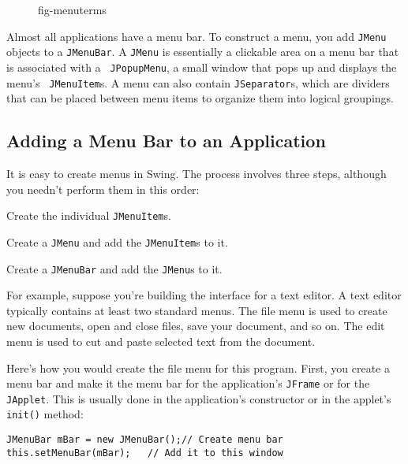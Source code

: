 \begin{figure}[h!]
{fig-menuterms}
\end{figure}

Almost all applications have a menu bar. To construct a menu, you add
{\tt JMenu} objects to a {\tt JMenuBar}. A {\tt JMenu} is essentially
a clickable area on a menu bar that is associated with a {\tt
JPopupMenu}, a small window that pops up and displays the menu's {\tt
JMenuItem}s.  A menu can also contain {\tt JSeparator}s, which are
dividers that can be placed between menu items to organize them into
logical groupings.

\subsection{Adding a Menu Bar to an Application}
\noindent It is easy to create menus in Swing. The process involves three steps,
although you needn't perform them in this order:

\begin{NL}
\item  Create the individual {\tt JMenuItem}s.
\item  Create a {\tt JMenu} and add the {\tt JMenuItem}s to it.
\item  Create a {\tt JMenuBar} and add the {\tt JMenu}s to it.
\end{NL}

For example, suppose you're building the interface for a text
editor. A text editor typically contains at least two standard
menus. The file menu is used to create new documents, open and close
files, save your document, and so on.  The edit menu is used to cut
and paste selected text from the document. 

Here's how you would create the file menu for this program. First, you
create a menu bar and make it the menu bar for the application's
{\tt JFrame} or for the {\tt JApplet}. This is usually done in the
application's constructor or in the applet's {\tt init()} method:

\begin{jjjlisting}
\begin{lstlisting}
JMenuBar mBar = new JMenuBar();// Create menu bar
this.setMenuBar(mBar);   // Add it to this window
\end{lstlisting}
\end{jjjlisting}

